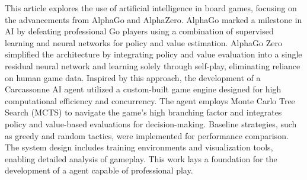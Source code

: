 This article explores the use of artificial intelligence in board games, focusing
on the advancements from AlphaGo\cite{AlphaGoAlgorithm} and AlphaZero\cite{AlphaZero}. 
AlphaGo marked a milestone in AI by defeating professional Go players using a 
combination of supervised learning and neural networks for policy and value estimation. 
AlphaGo Zero simplified the architecture by integrating policy and value evaluation 
into a single residual neural network and learning solely through self-play, 
eliminating reliance on human game data. Inspired by this approach, the development 
of a Carcassonne AI agent utilized a custom-built game engine designed for 
high computational efficiency and concurrency. The agent employs Monte Carlo Tree Search (MCTS) 
to navigate the game’s high branching factor and integrates policy and value-based 
evaluations for decision-making. Baseline strategies, such as greedy and random tactics, 
were implemented for performance comparison. The system design includes training 
environments and visualization tools, enabling detailed analysis of gameplay. 
This work lays a foundation for the development of a agent capable of professional play.
